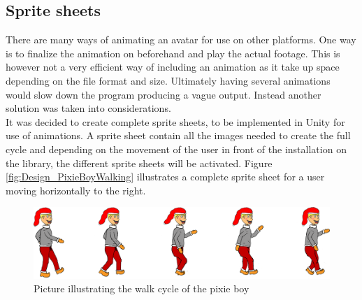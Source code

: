 \subsection{Sprite sheets}
There are many ways of animating an avatar for use on other platforms. One way is to finalize the animation on beforehand and play the actual footage. This is however not a very efficient way of including an animation as it take up space depending on the file format and size. Ultimately having several animations would slow down the program producing a vague output. Instead another solution was taken into considerations.\\
It was decided to create complete sprite sheets, to be implemented in Unity for use of animations. A sprite sheet contain all the images needed to create the full cycle and depending on the movement of the user in front of the installation on the library, the different sprite sheets will be activated. Figure \eqref{fig:Design_PixieBoyWalking} illustrates a complete sprite sheet for a user moving horizontally to the right.
\begin{figure}[htbp]
\centering
\includegraphics[width=1.00\textwidth]{Pictures/Design/PixieWalking.png}
\caption{Picture illustrating the walk cycle of the pixie boy}
\label{fig:Design_PixieBoyWalking}
\end{figure}